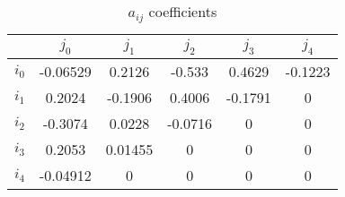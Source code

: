 \begin{table}[h!]
  \centering
  \caption{$a_{ij}$ coefficients}
  \label{tab:noise_a}
  \begin{tabular}{c| c c c c c}
     	  & $j_0$ 	 & $j_1$   & $j_2$ 	 & $j_3$   & $j_4$ \\
    \hline
   	$i_0$ & -0.06529 & 0.2126  & -0.533	 & 0.4629  & -0.1223 \\
   	$i_1$ & 0.2024   & -0.1906 & 0.4006	 & -0.1791 & 0 \\
   	$i_2$ & -0.3074  & 0.0228  & -0.0716 & 0 	   & 0 \\
   	$i_3$ & 0.2053   & 0.01455 & 0 		 & 0 	   & 0 \\
   	$i_4$ & -0.04912 & 0 	   & 0 		 & 0 	   & 0 \\
  \end{tabular}
\end{table}


